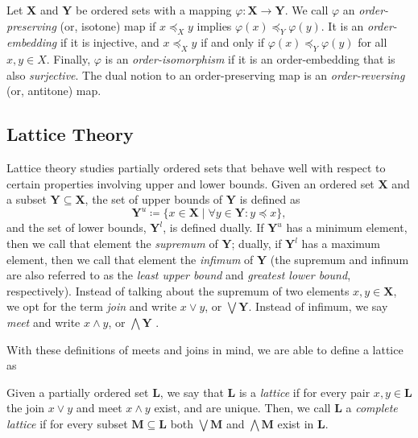 \begin{definition}
  \label{definition:order-maps}

       
  Let $\mathbf{X}$ and $\mathbf{Y}$ be ordered sets with a mapping $\varphi : \mathbf{X} \to \mathbf{Y}$. We call $\varphi$ an \textit{order-preserving} (or, isotone) map if $x \preceq_X y$ implies $\varphi(x) \preceq_Y \varphi(y)$. It is an \textit{order-embedding} if it is injective, and $x \preceq_X y$ if and only if $\varphi(x) \preceq_Y \varphi(y)$ for all $x,y \in X$. Finally, $\varphi$ is an \textit{order-isomorphism} if it is an order-embedding that is also \textit{surjective}. The dual notion to an order-preserving map is an \textit{order-reversing} (or, antitone) map. 
\end{definition}

\subsection{Lattice Theory}
\label{subsection:lattice-theory}
Lattice theory studies partially ordered sets that behave well with respect to certain properties involving upper and lower bounds. Given an ordered set $\mathbf{X}$ and a subset $\mathbf{Y} \subseteq \mathbf{X}$, the set of upper bounds of $\mathbf{Y}$ is defined as
\[
  \mathbf{Y}^u \coloneqq \{x \in \mathbf{X} \mid \forall y \in \mathbf{Y} : y \preceq x\},
\]
and the set of lower bounds, $\mathbf{Y}^l$, is defined dually. If $\mathbf{Y}^u$ has a minimum element, then we call that element the \textit{supremum} of $\mathbf{Y}$; dually, if $\mathbf{Y}^l$ has a maximum element, then we call that element the \textit{infimum} of $\mathbf{Y}$ (the supremum and infinum are also referred to as the \textit{least upper bound} and \textit{greatest lower bound}, respectively). Instead of talking about the supremum of two elements $x,y \in \mathbf{X}$, we opt for the term \textit{join} and write $x \vee y$, or $\bigvee \mathbf{Y}$. Instead of infimum, we say \textit{meet} and write $x \wedge y$, or $\bigwedge \mathbf{Y}$ \cite[p. 33]{davey2002introduction}.

   

With these definitions of meets and joins in mind, we are able to define a lattice as

\begin{definition}
     \label{definition:lattice}
Given a partially ordered set $\mathbf{L}$, we say that $\mathbf{L}$ is a \textit{lattice} if for every pair $x,y \in \mathbf{L}$ the join $x \vee y$ and meet $x \wedge y$ exist, and are unique. Then, we call $\mathbf{L}$ a \textit{complete lattice} if for every subset $\mathbf{M} \subseteq \mathbf{L}$ both $\bigvee \mathbf{M}$ and $\bigwedge \mathbf{M}$ exist in $\mathbf{L}$.
\end{definition}


